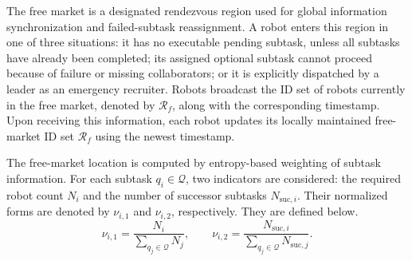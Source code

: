 \documentclass[lettersize,journal]{IEEEtran}
\begin{document}

The free market is a designated rendezvous region used for global information synchronization and failed-subtask reassignment. A robot enters this region in one of three situations: it has no executable pending subtask, unless all subtasks have already been completed; its assigned optional subtask cannot proceed because of failure or missing collaborators; or it is explicitly dispatched by a leader as an emergency recruiter. Robots broadcast the ID set of robots currently in the free market, denoted by $\mathcal{R}_f$, along with the corresponding timestamp. Upon receiving this information, each robot updates its locally maintained free-market ID set $\mathcal{R}_f$ using the newest timestamp.

The free-market location is computed by entropy-based weighting of subtask information. For each subtask $q_i \in \mathcal{Q}$, two indicators are considered: the required robot count $N_i$ and the number of successor subtasks $N_{\mathrm{suc},i}$. Their normalized forms are denoted by $\nu_{i,1}$ and $\nu_{i,2}$, respectively. They are defined below.
\begin{equation}
\nu_{i,1} = \frac{N_i}{\sum_{q_j \in \mathcal{Q}} N_j},
\qquad
\nu_{i,2} = \frac{N_{\mathrm{suc},i}}{\sum_{q_j \in \mathcal{Q}} N_{\mathrm{suc},j}}.
\end{equation}
\end{document}
